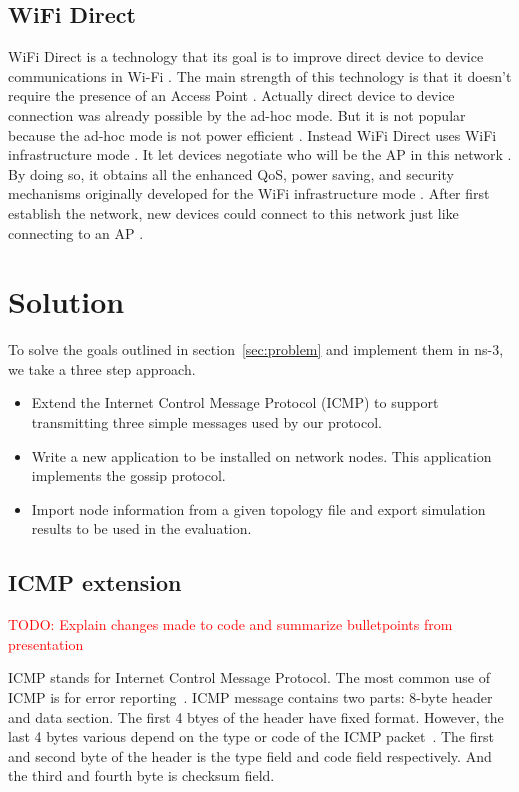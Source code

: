 \documentclass[12pt,journal]{IEEEtran}
\begin{document}
\subsection{WiFi Direct}
WiFi Direct is a technology that its goal is to improve direct device to device communications in Wi-Fi \cite{Mur}. The main strength of this technology is that it doesn’t require the presence of an Access Point \cite{Mur}. Actually direct device to device connection was already possible by the ad-hoc mode. But it is not popular because the ad-hoc mode is not power efficient \cite{Mur}. Instead WiFi Direct uses WiFi infrastructure mode \cite{Mur}. It let devices negotiate who will be the AP in this network \cite{Mur}. By doing so, it obtains all the enhanced QoS, power saving, and security mechanisms originally developed for the WiFi infrastructure mode \cite{Mur}. After first establish the network, new devices could connect to this network just like connecting to an AP \cite{Mur}.

\section{Solution}
To solve the goals outlined in section~\ref{sec:problem} and implement them in ns-3, we take a three step approach.

\begin{itemize}
 \item Extend the Internet Control Message Protocol (ICMP) to support transmitting three simple messages used by our protocol.
 \item Write a new application to be installed on network nodes. This application implements the gossip protocol.
 \item Import node information from a given topology file and export simulation results to be used in the evaluation.
\end{itemize}

\subsection{ICMP extension}
\textcolor{red}{TODO: Explain changes made to code and summarize bulletpoints from presentation}

ICMP stands for Internet Control Message Protocol. The most common use of ICMP is for error reporting~\cite{james}. ICMP message contains two parts: 8-byte header and data section. The first 4 btyes of the header have fixed format. However, the last 4 bytes various depend on the type or code of the ICMP packet~\cite{forouzan}. The first and second byte of the header is the type field and code field respectively. And the third and fourth byte is checksum field.
 
\end{document}

